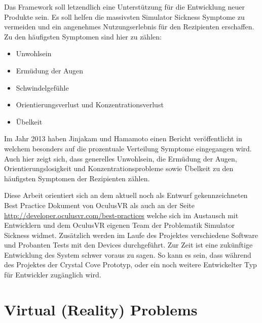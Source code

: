 \documentclass[pagesize, paper=a4, fontsize=12pt,titlepage=true, headings=small, headnosepline, abstractoff, liststotoc, nochapterprefix, plainheadsepline]{scrreprt}
\begin{document}
Das Framework soll letzendlich eine Unterstützung für die Entwicklung neuer Produkte sein. Es soll helfen die massivsten Simulator Sickness Symptome zu vermeiden und ein angenehmes Nutzungserlebnis für den Rezipienten erschaffen. Zu den häufigsten Symptomen sind hier zu zählen:
\begin{itemize}
\item Unwohlsein
\item Ermüdung der Augen
\item Schwindelgefühle
\item Orientierungsverlust und Konzentrationsverlust
\item Übelkeit
\end{itemize}

Im Jahr 2013 haben Jinjakam und Hamamoto einen Bericht veröffentlicht \cite{JinjakamHamamoto2012} in welchem besonders auf die prozentuale Verteilung Symptome eingegangen wird. Auch hier zeigt sich, dass generelles Unwohlsein, die Ermüdung der Augen, Orientierungslosigkeit und Konzentrationsprobleme sowie Übelkeit zu den häufigsten Symptomen der Rezipienten zählen.

Diese Arbeit orientiert sich an dem aktuell noch als Entwurf gekennzeichneten Best Practice Dokument von OculusVR als auch an der Seite \url{http://developer.oculusvr.com/best-practices} welche sich im Austausch mit Entwicklern und dem OculusVR eigenen Team der Problematik Simulator Sickness widmet. Zusätzlich werden im Laufe des Projektes verschiedene Software und Probanten Tests mit den Devices durchgeführt. Zur Zeit ist eine zukünftige Entwicklung des System schwer voraus zu sagen. So kann es sein, dass während des Projektes der Crystal Cove Prototyp, oder ein noch weitere Entwickelter Typ für Entwickler zugänglich wird.




\chapter{Virtual (Reality) Problems}
\end{document}
